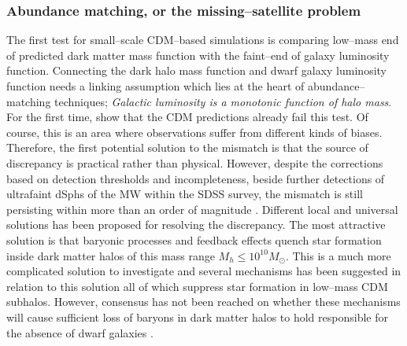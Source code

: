 \documentclass[paper=a4, fontsize=11pt]{scrartcl} %
\numberwithin{equation}{section} %
\numberwithin{figure}{section} %
\numberwithin{table}{section} %
\begin{document}
\subsubsection{Abundance matching, or the missing--satellite problem}
\label{subsec:missing-satellite}
The first test for small--scale CDM--based simulations is comparing low--mass end of predicted dark matter mass function with the faint--end of galaxy luminosity function. Connecting the dark halo mass function and dwarf galaxy luminosity function needs a linking assumption which lies at the heart of abundance--matching techniques; \emph{Galactic luminosity is a monotonic function of halo mass}. For the first time, \citet[][]{Klypin+1999, Moore+1999} show that the CDM predictions already fail this test. Of course, this is an area where observations suffer from different kinds of biases. Therefore, the first potential solution to the mismatch is that the source of discrepancy is practical rather than physical. However, despite the corrections based on detection thresholds and incompleteness, beside further detections of ultrafaint dSphs of the MW within the SDSS survey, the mismatch is still persisting within more than an order of magnitude \citep[See e.g.][]{Pawlowski+2015}. Different local and universal solutions has been proposed for resolving the discrepancy. The most attractive solution is that baryonic processes and feedback effects quench star formation inside dark matter halos of this mass range $M_h \leq 10^{10} M_\odot$. This is a much more complicated solution to investigate and several mechanisms has been suggested in relation to this solution all of which suppress star formation in low--mass CDM subhalos. However, consensus has not been reached on whether these mechanisms will cause sufficient loss of baryons in dark matter halos to hold responsible for the absence of dwarf galaxies \citep[See e.g. \citet{Brooks+2013, Sawala+2014, DelPopolo+2014} claiming to have found baryonic solutions to the problem, but also for opposite arguments see \citet{Bullock+2010, Klypin+2015}][]{}.

 
\end{document}
